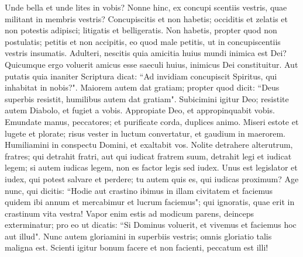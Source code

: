 \begin{biblechapter} 
\verse Unde bella et unde lites in vobis? Nonne hinc, ex concupi scentiis vestris, quae militant in membris vestris? 
\verse Concupiscitis et non habetis; occiditis et zelatis et non potestis adipisci; litigatis et belligeratis. Non habetis, propter quod non postulatis; 
\verse petitis et non accipitis, eo quod male petitis, ut in concupiscentiis vestris insumatis. 
\verse Adulteri, nescitis quia amicitia huius mundi inimica est Dei? Quicumque ergo voluerit amicus esse saeculi huius, inimicus Dei constituitur.  
\verse Aut putatis quia inaniter Scriptura dicat: “Ad invidiam concupiscit Spiritus, qui inhabitat in nobis?". 
\verse Maiorem autem dat gratiam; propter quod dicit: “Deus superbis resistit, humilibus autem dat gratiam". 
\verse Subicimini igitur Deo; resistite autem Diabolo, et fugiet a vobis. 
\verse Appropiate Deo, et appropinquabit vobis. Emundate manus, peccatores; et purificate corda, duplices animo. 
\verse Miseri estote et lugete et plorate; risus vester in luctum convertatur, et gaudium in maerorem. 
\verse Humiliamini in conspectu Domini, et exaltabit vos. 
\verse Nolite detrahere alterutrum, fratres; qui detrahit fratri, aut qui iudicat fratrem suum, detrahit legi et iudicat legem; si autem iudicas legem, non es factor legis sed iudex. 
\verse Unus est legislator et iudex, qui potest salvare et perdere; tu autem quis es, qui iudicas proximum? 
\verse Age nunc, qui dicitis: “Hodie aut crastino ibimus in illam civitatem et faciemus quidem ibi annum et mercabimur et lucrum faciemus"; 
\verse qui ignoratis, quae erit in crastinum vita vestra! Vapor enim estis ad modicum parens, deinceps exterminatur; 
\verse pro eo ut dicatis: “Si Dominus voluerit, et vivemus et faciemus hoc aut illud". 
\verse Nunc autem gloriamini in superbiis vestris; omnis gloriatio talis maligna est. 
\verse Scienti igitur bonum facere et non facienti, peccatum est illi! 
\end{biblechapter}

